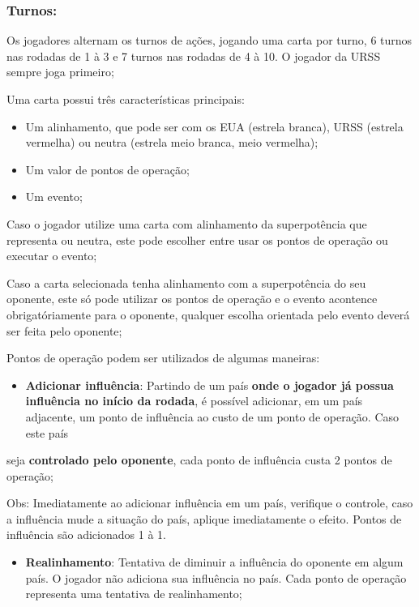 \documentclass[11pt]{article}
\begin{document}
\subsubsection{Turnos:}
\label{sec:orgc3fc408}

Os jogadores alternam os turnos de ações, jogando uma carta por turno, 6 turnos nas rodadas de 1 à 3 e 7 turnos nas rodadas de 4 à 10. O jogador da URSS sempre joga primeiro;

Uma carta possui três características principais:

\begin{itemize}
\item Um alinhamento, que pode ser com os EUA (estrela branca), URSS (estrela vermelha) ou neutra (estrela meio branca, meio vermelha);

\item Um valor de pontos de operação;

\item Um evento;
\end{itemize}

Caso o jogador utilize uma carta com alinhamento da superpotência que representa ou neutra, este pode escolher entre usar os pontos de operação ou executar o evento;

Caso a carta selecionada tenha alinhamento com a superpotência do seu oponente, este só pode utilizar os pontos de operação e o evento acontence obrigatóriamente para o oponente, qualquer escolha orientada pelo evento
deverá ser feita pelo oponente;

Pontos de operação podem ser utilizados de algumas maneiras:

\begin{itemize}
\item \textbf{Adicionar influência}: Partindo de um país \textbf{onde o jogador já possua influência no início da rodada}, é possível adicionar, em um país adjacente, um ponto de influência ao custo de um ponto de operação. Caso este país
\end{itemize}
seja \textbf{controlado pelo oponente}, cada ponto de influência custa 2 pontos de operação;

Obs: Imediatamente ao adicionar influência em um país, verifique o controle, caso a influência mude a situação do país, aplique imediatamente o efeito. Pontos de influência são adicionados 1 à 1.

\begin{itemize}
\item \textbf{Realinhamento}: Tentativa de diminuir a influência do oponente em algum país. O jogador não adiciona sua influência no país. Cada ponto de operação representa uma tentativa de realinhamento;
\end{itemize}
\end{document}
